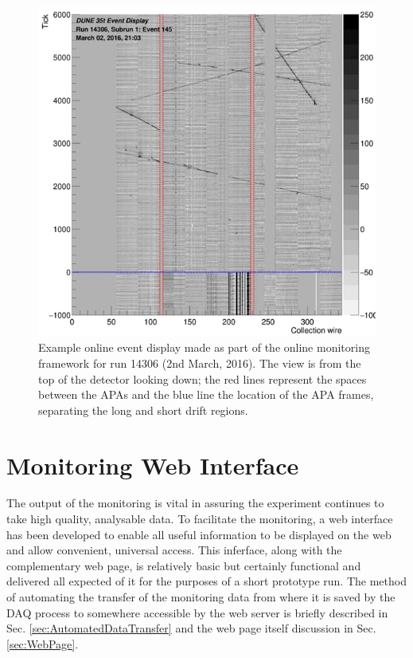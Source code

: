 \begin{figure}[p]
  \centering
  \includegraphics[width=14cm]{evd.png}
  \caption{Example online event display made as part of the online monitoring framework for run 14306 (2nd March, 2016).  The view is from the top of the detector looking down; the red lines represent the spaces between the APAs and the blue line the location of the APA frames, separating the long and short drift regions.}
  \label{fig:EVD}
\end{figure}

\section{Monitoring Web Interface}\label{sec:WebInterface}

The output of the monitoring is vital in assuring the experiment continues to take high quality, analysable data.  To facilitate the monitoring, a web interface has been developed to enable all useful information to be displayed on the web and allow convenient, universal access.  This inferface, along with the complementary web page, is relatively basic but certainly functional and delivered all expected of it for the purposes of a short prototype run.  The method of automating the transfer of the monitoring data from where it is saved by the DAQ process to somewhere accessible by the web server is briefly described in Sec. \ref{sec:AutomatedDataTransfer} and the web page itself discussion in Sec. \ref{sec:WebPage}.

